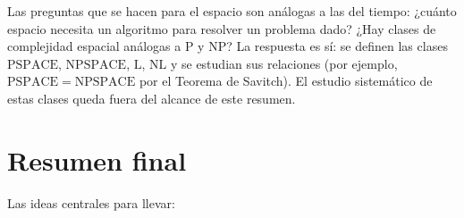 \documentclass[11pt,a4paper]{article}
\theoremstyle{definicion}
\newcommand{\NP}{\mathrm{NP}}
\newcommand{\Pclass}{\mathrm{P}}
\begin{document}
\begin{intuicion}
Las preguntas que se hacen para el espacio son análogas a las del tiempo: ¿cuánto espacio necesita un algoritmo para resolver un problema dado? ¿Hay clases de complejidad espacial análogas a $\Pclass$ y $\NP$? La respuesta es sí: se definen las clases $\mathrm{PSPACE}$, $\mathrm{NPSPACE}$, $\mathrm{L}$, $\mathrm{NL}$ y se estudian sus relaciones (por ejemplo, $\mathrm{PSPACE} = \mathrm{NPSPACE}$ por el Teorema de Savitch). El estudio sistemático de estas clases queda fuera del alcance de este resumen.
\end{intuicion}

\section{Resumen final}

Las ideas centrales para llevar:
\end{document}
